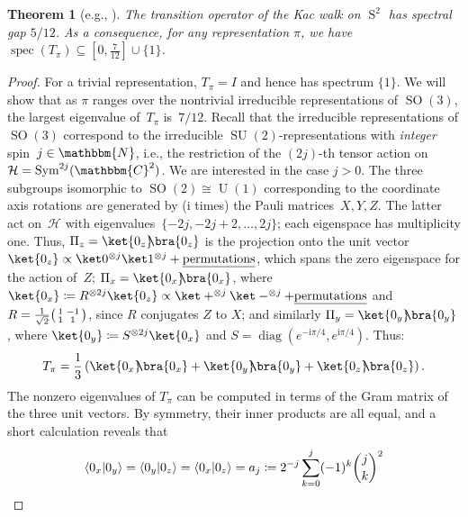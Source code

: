 \documentclass[11pt,a4paper]{article}
\newtheorem{theorem}{Theorem}[section]
\numberwithin{equation}{section}
\newcommand{\ot}{\otimes}
\newcommand{\CC}{\mathbbm{C}}
\newcommand{\NN}{\mathbbm{N}}
\newcommand{\HH}{\mathcal{H}}
\newcommand{\1}{\mathbf{1}}
\renewcommand{\S}{\operatorname{S}}
\DeclareMathOperator{\SO}{SO}
\DeclareMathOperator{\U}{U}
\DeclareMathOperator{\SU}{SU}
\DeclareMathOperator{\Sym}{Sym}
\DeclareMathOperator{\spec}{spec}
\DeclarePairedDelimiter\ip{\langle}{\rangle}
\begin{document}
\begin{theorem}[{e.g., \cite[Thm.~1.3, $N=3$, $\rho=\frac1{2\pi}$]{carlen2003determination}}]\label{thm:kac-walk}
    The transition operator of the Kac walk on $\S^2$ has spectral gap $5/12$.
    As a consequence, for any representation $\pi$, we have $\spec(T_\pi) \subseteq [0,\frac7{12}] \cup \{1\}$.
\end{theorem}
\begin{proof}
    For a trivial representation, $T_\pi = I$ and hence has spectrum $\{1\}$.
    We will show that as $\pi$ ranges over the nontrivial irreducible representations of $\SO(3)$, the largest eigenvalue of~$T_\pi$ is~$7/12$.
    Recall that the irreducible representations of $\SO(3)$ correspond to the irreducible $\SU(2)$-representations with \emph{integer} spin~$j\in\NN$, i.e., the restriction of the $(2j)$-th tensor action on $\HH = \Sym^{2j}(\CC^2)$.
    We are interested in the case $j>0$.
    The three subgroups isomorphic to $\SO(2) \cong \U(1)$ corresponding to the coordinate axis rotations are generated by ($\mathrm{i}$ times) the Pauli matrices~$X,Y,Z$.
    The latter act on~$\HH$ with eigenvalues~$\{-2j,-2j+2,\dots,2j\}$; each eigenspace has multiplicity one.
    Thus, $\Pi_z = \ket{0_z}\!\!\bra{0_z}$ is the projection onto the unit vector $\ket{0_z} \propto \ket0^{\ot j}\ket1^{\ot j} + \emph{\text{permutations}}$, which spans the zero eigenspace for the action of~$Z$;
    $\Pi_x = \ket{0_x}\!\!\bra{0_x}$, where $\ket{0_x} \coloneqq R^{\ot 2j} \ket{0_z} \propto \ket+^{\ot j} \ket-^{\ot j} + \emph{\text{permutations}}$ and $R = \frac1{\sqrt2}\begin{psmallmatrix}1 & -1\\1 & 1\end{psmallmatrix}$, since $R$ conjugates $Z$ to $X$;
    and similarly $\Pi_y = \ket{0_y}\!\!\bra{0_y}$, where $\ket{0_y} \coloneqq S^{\ot 2j} \ket{0_x}$ and $S = \operatorname{diag}(e^{-\mathrm{i}\pi/4}, e^{\mathrm{i}\pi/4})$.
    Thus:
    \begin{align*}
        T_\pi = \frac13 \left( \ket{0_x}\!\!\bra{0_x} + \ket{0_y}\!\!\bra{0_y} + \ket{0_z}\!\!\bra{0_z} \right).
    \end{align*}
    The nonzero eigenvalues of $T_\pi$ can be computed in terms of the Gram matrix of the three unit vectors.
    By symmetry, their inner products are all equal, and a short calculation reveals that
    \begin{align*}
        \ip{0_x|0_y} = \ip{0_y|0_z} = \ip{0_x|0_z} = a_j \coloneqq 2^{-j}\sum_{k=0}^j(-1)^k\binom jk^2

\end{align*}
\end{proof}
\end{document}
